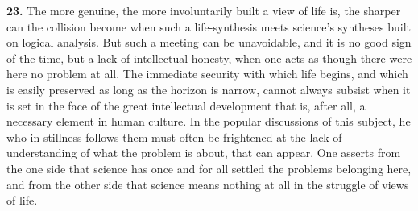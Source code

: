 \documentclass[12pt]{book}
\newcommand{\hnum}[1]{\textbf{#1.}\enspace}
\newcommand{\opage}[1]{\marginnote{\footnotesize\textit{[#1]}}}
\begin{document}
\hnum{23} The more genuine, the more involuntarily built a view of life is, the sharper can the collision become
when such a life-synthesis meets science's syntheses built on logical analysis. But such a meeting can be
unavoidable, and it is no good sign of the time, but a lack of intellectual honesty, when one acts as though there
were here no problem at all. The immediate security \opage{72}with which life begins, and which is easily preserved as long as
the horizon is narrow, cannot always subsist when it is set in the face of the great intellectual development that
is, after all, a necessary element in human culture. In the popular discussions of this subject, he who in stillness
follows them must often be frightened at the lack of understanding of what the problem is about, that can appear. One
asserts from the one side that science has once and for all settled the problems belonging here, and from the other
side that science means nothing at all in the struggle of views of life.
\end{document}
